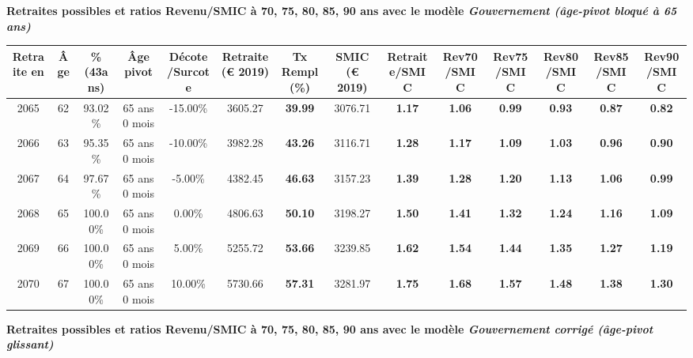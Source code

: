 {\bf \noindent Retraites possibles et ratios Revenu/SMIC à 70, 75, 80, 85, 90 ans avec le modèle \emph{Gouvernement (âge-pivot bloqué à 65 ans)}}  
 
\begin{adjustbox}{max width=\textwidth} 
\begin{tabular}[htb]{|c|c||c|c|c||c|c||c||c|c|c|c|c|c|} 
\hline 
 Retraite en &  Âge &  \%(43ans) &  Âge pivot &  Décote/Surcote &  Retraite (\euro{} 2019) &  Tx Rempl(\%) &  SMIC (\euro{} 2019) &  Retraite/SMIC &  Rev70/SMIC &  Rev75/SMIC &  Rev80/SMIC &  Rev85/SMIC &  Rev90/SMIC \\ 
\hline \hline 
 2065 &  62 &  93.02\% &  65 ans 0 mois &  -15.00\% &  3605.27 &  {\bf 39.99} &  3076.71 &  {\bf 1.17} &  {\bf 1.06} &  {\bf {\color{red} 0.99}} &  {\bf {\color{red} 0.93}} &  {\bf {\color{red} 0.87}} &  {\bf {\color{red} 0.82}} \\ 
\hline 
 2066 &  63 &  95.35\% &  65 ans 0 mois &  -10.00\% &  3982.28 &  {\bf 43.26} &  3116.71 &  {\bf 1.28} &  {\bf 1.17} &  {\bf 1.09} &  {\bf 1.03} &  {\bf {\color{red} 0.96}} &  {\bf {\color{red} 0.90}} \\ 
\hline 
 2067 &  64 &  97.67\% &  65 ans 0 mois &  -5.00\% &  4382.45 &  {\bf 46.63} &  3157.23 &  {\bf 1.39} &  {\bf 1.28} &  {\bf 1.20} &  {\bf 1.13} &  {\bf 1.06} &  {\bf {\color{red} 0.99}} \\ 
\hline 
 2068 &  65 &  100.00\% &  65 ans 0 mois &  0.00\% &  4806.63 &  {\bf 50.10} &  3198.27 &  {\bf 1.50} &  {\bf 1.41} &  {\bf 1.32} &  {\bf 1.24} &  {\bf 1.16} &  {\bf 1.09} \\ 
\hline 
 2069 &  66 &  100.00\% &  65 ans 0 mois &  5.00\% &  5255.72 &  {\bf 53.66} &  3239.85 &  {\bf 1.62} &  {\bf 1.54} &  {\bf 1.44} &  {\bf 1.35} &  {\bf 1.27} &  {\bf 1.19} \\ 
\hline 
 2070 &  67 &  100.00\% &  65 ans 0 mois &  10.00\% &  5730.66 &  {\bf 57.31} &  3281.97 &  {\bf 1.75} &  {\bf 1.68} &  {\bf 1.57} &  {\bf 1.48} &  {\bf 1.38} &  {\bf 1.30} \\ 
\hline 
\hline 
\end{tabular} 
\end{adjustbox} 
 
 \vspace{0.1cm} 
{\bf \noindent Retraites possibles et ratios Revenu/SMIC à 70, 75, 80, 85, 90 ans avec le modèle \emph{Gouvernement corrigé (âge-pivot glissant)}}  
 

